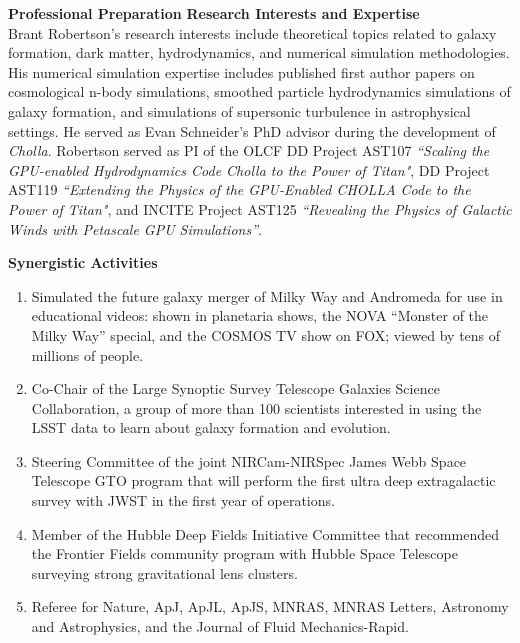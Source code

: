 \documentclass[11pt,letterpaper,english]{article}
\begin{document}
\begin{flushleft} {\bf Professional Preparation}
\vspace{-6pt}
{\bf Research Interests and Expertise}
{\parindent 16pt ~\\
Brant Robertson's research interests include theoretical topics related to galaxy formation, dark matter, hydrodynamics, and numerical simulation methodologies. His numerical simulation expertise includes published first author papers on cosmological n-body simulations, smoothed particle hydrodynamics simulations of galaxy formation, and simulations of supersonic turbulence in astrophysical settings. He served as Evan Schneider's PhD advisor during the development of {\it Cholla}. Robertson served as PI of the OLCF DD Project AST107 \textit{``Scaling the GPU-enabled Hydrodynamics Code Cholla to the Power of Titan"}, DD Project AST119 \textit{``Extending the Physics of the GPU-Enabled CHOLLA Code to the Power of Titan"}, and INCITE Project AST125 \textit{``Revealing the Physics of Galactic Winds with Petascale GPU Simulations''}.
}

\vspace{.04in}
{\bf Synergistic Activities}
\vspace{-6pt}
\begin{enumerate} \itemsep1pt \parskip0pt 
\item Simulated the future galaxy merger of Milky Way and Andromeda for use in educational videos: shown
in planetaria shows, the NOVA ``Monster of the Milky Way'' special, and the COSMOS TV show on FOX;
viewed by tens of millions of people.\\
\item Co-Chair of the Large Synoptic Survey Telescope Galaxies Science Collaboration, a group of more
than 100 scientists interested in using the LSST data to learn about galaxy formation and evolution.\\
\item Steering Committee of the joint NIRCam-NIRSpec James Webb Space Telescope GTO program that
will perform the first ultra deep extragalactic survey with JWST in the first year of operations.\\
\item Member of the Hubble Deep Fields Initiative Committee that recommended the Frontier Fields
community program with Hubble Space Telescope surveying strong gravitational lens clusters.\\
\item Referee for Nature, ApJ, ApJL, ApJS, MNRAS, MNRAS Letters, Astronomy and Astrophysics, and the
Journal of Fluid Mechanics-Rapid.\\
\end{enumerate} 


\end{flushleft}
\end{document}
